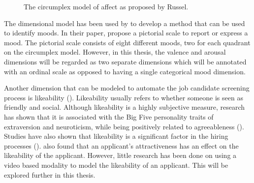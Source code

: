\begin{figure}[h]
  \centering
  
  \caption{The circumplex model of affect as proposed by Russel.}
  \label{fig:circumplexrussel}
\end{figure}

The dimensional model has been used by \textcite{desmet2016mood} to develop a method that can be used to identify moods. In their paper, \citeauthor{desmet2016mood} propose a pictorial scale to report or express a mood. The pictorial scale consists of eight different moods, two for each quadrant on the circumplex model. However, in this thesis, the valence and arousal dimensions will be regarded as two separate dimensions which will be annotated with an ordinal scale as opposed to having a single categorical mood dimension.

Another dimension that can be modeled to automate the job candidate screening process is likeability (\cite{celiktutan2015automatic}). Likeability usually refers to whether someone is seen as friendly and social. Although likeability is a highly subjective measure, research has shown that it is associated with the Big Five personality traits of extraversion and neuroticism, while being positively related to agreeableness (\cite{van2010classroom}). Studies have also shown that likeability is a significant factor in the hiring processes (\cite{raza1987model}). \citeauthor{hayes1997comparison} also found that an applicant's attractiveness has an effect on the likeability of the applicant. However, little research has been done on using a video based modality to model the likeability of an applicant. This will be explored further in this thesis. 

